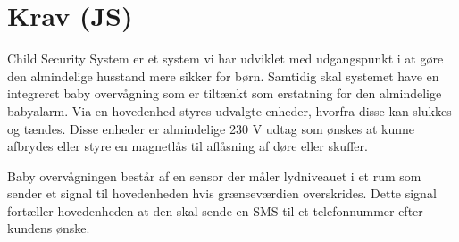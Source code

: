 \chapter{Krav (JS)}
Child Security System er et system vi har udviklet med udgangspunkt i at gøre den almindelige husstand mere sikker for børn. Samtidig skal systemet have en integreret baby overvågning som er tiltænkt som erstatning for den almindelige babyalarm.
Via en hovedenhed styres udvalgte enheder, hvorfra disse kan slukkes og tændes. Disse enheder er almindelige 230 V udtag som ønskes at kunne afbrydes eller styre en magnetlås til aflåsning af døre eller skuffer.

Baby overvågningen består af en sensor der måler lydniveauet i et rum som sender et signal til hovedenheden hvis grænseværdien overskrides. Dette signal fortæller hovedenheden at den skal sende en SMS til et telefonnummer efter kundens ønske.   
